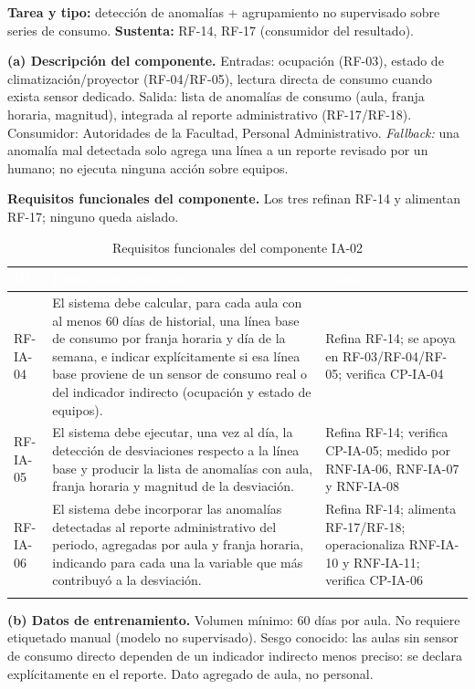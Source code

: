 \textbf{Tarea y tipo:} detecci\'on de anomal\'ias + agrupamiento no supervisado sobre series de consumo. \textbf{Sustenta:} RF-14, RF-17 (consumidor del resultado).

\textbf{(a) Descripci\'on del componente.} Entradas: ocupaci\'on (RF-03), estado de climatizaci\'on/proyector (RF-04/RF-05), lectura directa de consumo cuando exista sensor dedicado. Salida: lista de anomal\'ias de consumo (aula, franja horaria, magnitud), integrada al reporte administrativo (RF-17/RF-18). Consumidor: Autoridades de la Facultad, Personal Administrativo. \emph{Fallback:} una anomal\'ia mal detectada solo agrega una l\'inea a un reporte revisado por un humano; no ejecuta ninguna acci\'on sobre equipos.

\textbf{Requisitos funcionales del componente.} Los tres refinan RF-14 y alimentan RF-17; ninguno queda aislado.

\begingroup
\small
\begin{longtable}{|p{2.1cm}|p{9.4cm}|p{3.4cm}|}
\hline
\cellcolor{sigagreen}\textcolor{white}{\textbf{ID}} & \cellcolor{sigagreen}\textcolor{white}{\textbf{Enunciado verificable}} & \cellcolor{sigagreen}\textcolor{white}{\textbf{Traza}} \\ \hline
RF-IA-04 & El sistema debe calcular, para cada aula con al menos 60 d\'ias de historial, una l\'inea base de consumo por franja horaria y d\'ia de la semana, e indicar expl\'icitamente si esa l\'inea base proviene de un sensor de consumo real o del indicador indirecto (ocupaci\'on y estado de equipos). & Refina RF-14; se apoya en RF-03/RF-04/RF-05; verifica CP-IA-04 \\ \hline
RF-IA-05 & El sistema debe ejecutar, una vez al d\'ia, la detecci\'on de desviaciones respecto a la l\'inea base y producir la lista de anomal\'ias con aula, franja horaria y magnitud de la desviaci\'on. & Refina RF-14; verifica CP-IA-05; medido por RNF-IA-06, RNF-IA-07 y RNF-IA-08 \\ \hline
RF-IA-06 & El sistema debe incorporar las anomal\'ias detectadas al reporte administrativo del periodo, agregadas por aula y franja horaria, indicando para cada una la variable que m\'as contribuy\'o a la desviaci\'on. & Refina RF-14; alimenta RF-17/RF-18; operacionaliza RNF-IA-10 y RNF-IA-11; verifica CP-IA-06 \\ \hline
\caption{Requisitos funcionales del componente IA-02}
\end{longtable}
\endgroup

\textbf{(b) Datos de entrenamiento.} Volumen m\'inimo: 60 d\'ias por aula. No requiere etiquetado manual (modelo no supervisado). Sesgo conocido: las aulas sin sensor de consumo directo dependen de un indicador indirecto menos preciso: se declara expl\'icitamente en el reporte. Dato agregado de aula, no personal.

